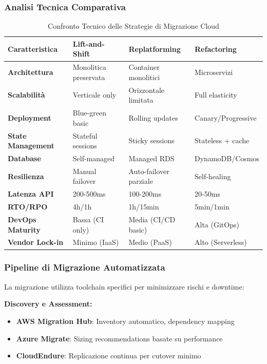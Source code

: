 \subsubsection{\texorpdfstring{\textbf{Analisi Tecnica Comparativa}}{3.4.1.2 - Analisi Tecnica Comparativa}}

\begin{table}[htbp]
\centering
\caption{Confronto Tecnico delle Strategie di Migrazione Cloud}
\label{tab:cloud_migration_technical}
\begin{tabular}{p{3cm}p{3.5cm}p{3.5cm}p{3.5cm}}
\toprule
\textbf{Caratteristica} & \textbf{Lift-and-Shift} & \textbf{Replatforming} & \textbf{Refactoring} \\
\midrule
\textbf{Architettura} & Monolitica preservata & Container monolitici & Microservizi \\
\textbf{Scalabilità} & Verticale only & Orizzontale limitata & Full elasticity \\
\textbf{Deployment} & Blue-green basic & Rolling updates & Canary/Progressive \\
\textbf{State Management} & Stateful sessions & Sticky sessions & Stateless + cache \\
\textbf{Database} & Self-managed & Managed RDS & DynamoDB/Cosmos \\
\textbf{Resilienza} & Manual failover & Auto-failover parziale & Self-healing \\
\textbf{Latenza API} & 200-500ms & 100-200ms & 20-50ms \\
\textbf{RTO/RPO} & 4h/1h & 1h/15min & 5min/1min \\
\textbf{DevOps Maturity} & Bassa (CI only) & Media (CI/CD basic) & Alta (GitOps) \\
\textbf{Vendor Lock-in} & Minimo (IaaS) & Medio (PaaS) & Alto (Serverless) \\
\bottomrule
\end{tabular}
\end{table}

\subsubsection{\texorpdfstring{\textbf{Pipeline di Migrazione Automatizzata}}{3.4.1.3 - Pipeline di Migrazione Automatizzata}}

La migrazione utilizza toolchain specifici per minimizzare rischi e downtime:

\textbf{Discovery e Assessment:}
\begin{itemize}
    \item \textbf{AWS Migration Hub}: Inventory automatico, dependency mapping
    \item \textbf{Azure Migrate}: Sizing recommendations basate su performance
    \item \textbf{CloudEndure}: Replicazione continua per cutover minimo
\end{itemize}

